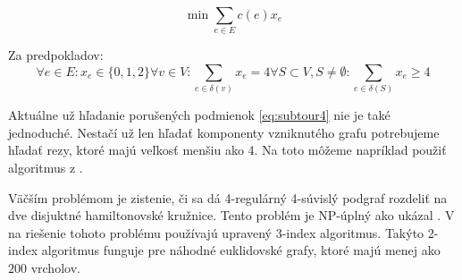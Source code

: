 $$\min \sum_{e \in E} c(e) x_e$$ 

Za predpokladov:
\begin{subequations}
\begin{equation}\forall e \in E: x_e \in \{0, 1, 2\}\end{equation}
\begin{equation}\forall v \in V: \sum_{e \in \delta(v)} x_e = 4\end{equation}
\begin{equation}\forall S \subset V, S \neq \emptyset: \sum_{e \in \delta(S)} x_e \geq 4
\label{eq:subtour4}
\end{equation}
\end{subequations}

Aktuálne už hľadanie porušených podmienok \eqref{eq:subtour4} nie je také jednoduché.
Nestačí už len hľadať komponenty vzniknutého grafu potrebujeme hľadať rezy, ktoré
majú veľkosť menšiu ako 4. Na toto môžeme napríklad použiť algoritmus z \cite{stoer}. 

Väčším problémom je zistenie, či sa dá 4-regulárný 4-súvislý podgraf rozdeliť na dve
disjuktné hamiltonovské kružnice. Tento problém je NP-úplný ako ukázal \cite{hamdecomp}.
V \cite{duchenne} na riešenie tohoto problému používajú upravený 3-index algoritmus.
Takýto 2-index algoritmus funguje pre náhodné euklidovské grafy, ktoré majú menej ako $200$
vrcholov.
